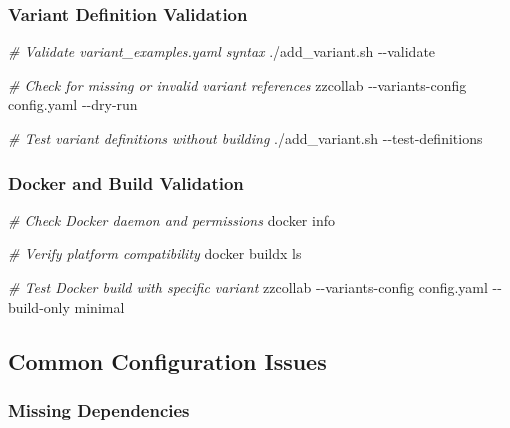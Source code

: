 \documentclass[
]{article}
\newenvironment{Shaded}{\begin{snugshade}}{\end{snugshade}}
\newcommand{\AttributeTok}[1]{\textcolor[rgb]{0.13,0.29,0.53}{#1}}
\newcommand{\CommentTok}[1]{\textcolor[rgb]{0.56,0.35,0.01}{\textit{#1}}}
\newcommand{\ExtensionTok}[1]{#1}
\newcommand{\NormalTok}[1]{#1}
\begin{document}
\subsubsection{Variant Definition
Validation}\label{variant-definition-validation}

\begin{Shaded}
\begin{Highlighting}[]
\CommentTok{\# Validate variant\_examples.yaml syntax}
\ExtensionTok{./add\_variant.sh} \AttributeTok{{-}{-}validate}

\CommentTok{\# Check for missing or invalid variant references}
\ExtensionTok{zzcollab} \AttributeTok{{-}{-}variants{-}config}\NormalTok{ config.yaml }\AttributeTok{{-}{-}dry{-}run}

\CommentTok{\# Test variant definitions without building}
\ExtensionTok{./add\_variant.sh} \AttributeTok{{-}{-}test{-}definitions}
\end{Highlighting}
\end{Shaded}

\subsubsection{Docker and Build
Validation}\label{docker-and-build-validation}

\begin{Shaded}
\begin{Highlighting}[]
\CommentTok{\# Check Docker daemon and permissions}
\ExtensionTok{docker}\NormalTok{ info}

\CommentTok{\# Verify platform compatibility}
\ExtensionTok{docker}\NormalTok{ buildx ls}

\CommentTok{\# Test Docker build with specific variant}
\ExtensionTok{zzcollab} \AttributeTok{{-}{-}variants{-}config}\NormalTok{ config.yaml }\AttributeTok{{-}{-}build{-}only}\NormalTok{ minimal}
\end{Highlighting}
\end{Shaded}

\subsection{Common Configuration
Issues}\label{common-configuration-issues}

\subsubsection{Missing Dependencies}\label{missing-dependencies}
\end{document}

